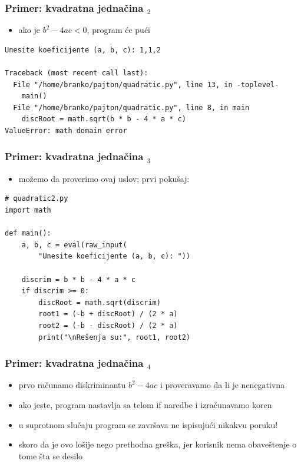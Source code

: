 \documentclass[utf8,compress]{beamer}
\begin{document}
\begin{frame}[fragile]
  \frametitle{Primer: kvadratna jednačina $_2$}
  \begin{itemize}
    \item ako je $b^2 - 4ac < 0$, program će pući
  \end{itemize}
\begin{verbatim}
Unesite koeficijente (a, b, c): 1,1,2

Traceback (most recent call last):
  File "/home/branko/pajton/quadratic.py", line 13, in -toplevel-
    main()
  File "/home/branko/pajton/quadratic.py", line 8, in main
    discRoot = math.sqrt(b * b - 4 * a * c)
ValueError: math domain error
\end{verbatim}
\end{frame}

\begin{frame}[fragile]
  \frametitle{Primer: kvadratna jednačina $_3$}
  \begin{itemize}
    \item možemo da proverimo ovaj uslov; prvi pokušaj:
  \end{itemize}
\begin{verbatim}
# quadratic2.py
import math  

def main():
    a, b, c = eval(raw_input(
        "Unesite koeficijente (a, b, c): "))

    discrim = b * b - 4 * a * c
    if discrim >= 0:
        discRoot = math.sqrt(discrim)
        root1 = (-b + discRoot) / (2 * a)
        root2 = (-b - discRoot) / (2 * a)
        print("\nRešenja su:", root1, root2)
\end{verbatim}
\end{frame}

\begin{frame}[fragile]
  \frametitle{Primer: kvadratna jednačina $_4$}
  \begin{itemize}
    \item prvo računamo diskriminantu $b^2-4ac$ i proveravamo da li je nenegativna
    \item ako jeste, program nastavlja sa telom if naredbe i izračunavamo koren
    \item u suprotnom slučaju program se završava ne ispisujući nikakvu poruku!
    \item skoro da je ovo lošije nego prethodna greška, jer korisnik nema obaveštenje o tome šta se desilo
  \end{itemize}
\end{frame}
\end{document}

